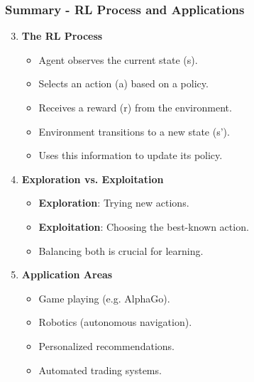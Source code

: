 \documentclass[aspectratio=169]{beamer}
\begin{document}
\begin{frame}[fragile]
    \frametitle{Summary - RL Process and Applications}
    \begin{enumerate}
        \setcounter{enumi}{2}
        \item \textbf{The RL Process}
            \begin{itemize}
                \item Agent observes the current state (s).
                \item Selects an action (a) based on a policy.
                \item Receives a reward (r) from the environment.
                \item Environment transitions to a new state (s').
                \item Uses this information to update its policy.
            \end{itemize}

        \item \textbf{Exploration vs. Exploitation}
            \begin{itemize}
                \item \textbf{Exploration}: Trying new actions.
                \item \textbf{Exploitation}: Choosing the best-known action.
                \item Balancing both is crucial for learning.
            \end{itemize}

        \item \textbf{Application Areas}
            \begin{itemize}
                \item Game playing (e.g. AlphaGo).
                \item Robotics (autonomous navigation).
                \item Personalized recommendations.
                \item Automated trading systems.
            \end{itemize}
    \end{enumerate}
\end{frame}
\end{document}
